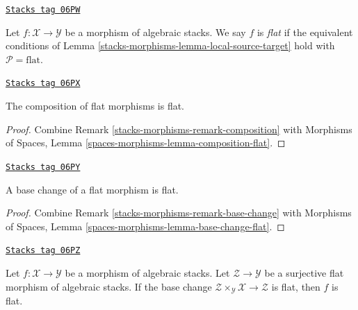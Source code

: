 \begin{definition}[Flat]
\label{stacks-morphisms-definition-flat}
\href{https://stacks.math.columbia.edu/tag/06PW}{\texttt{Stacks tag 06PW}}

Let $f : \mathcal{X} \to \mathcal{Y}$ be a morphism of algebraic stacks.
We say $f$ is {\it flat} if the equivalent conditions of
Lemma \ref{stacks-morphisms-lemma-local-source-target}
hold with $\mathcal{P} = \text{flat}$.
\end{definition}

\begin{lemma}
\label{stacks-morphisms-lemma-composition-flat}
\href{https://stacks.math.columbia.edu/tag/06PX}{\texttt{Stacks tag 06PX}}

The composition of flat morphisms is flat.
\end{lemma}

\begin{proof}
Combine
Remark \ref{stacks-morphisms-remark-composition}
with
Morphisms of Spaces, Lemma
\ref{spaces-morphisms-lemma-composition-flat}.
\end{proof}

\begin{lemma}
\label{stacks-morphisms-lemma-base-change-flat}
\href{https://stacks.math.columbia.edu/tag/06PY}{\texttt{Stacks tag 06PY}}

A base change of a flat morphism is flat.
\end{lemma}

\begin{proof}
Combine
Remark \ref{stacks-morphisms-remark-base-change}
with
Morphisms of Spaces, Lemma
\ref{spaces-morphisms-lemma-base-change-flat}.
\end{proof}

\begin{lemma}
\label{stacks-morphisms-lemma-descent-flat}
\href{https://stacks.math.columbia.edu/tag/06PZ}{\texttt{Stacks tag 06PZ}}

Let $f : \mathcal{X} \to \mathcal{Y}$ be a morphism of algebraic stacks.
Let $\mathcal{Z} \to \mathcal{Y}$ be a surjective flat morphism of algebraic
stacks. If the base change
$\mathcal{Z} \times_\mathcal{Y} \mathcal{X} \to \mathcal{Z}$
is flat, then $f$ is flat.
\end{lemma}

